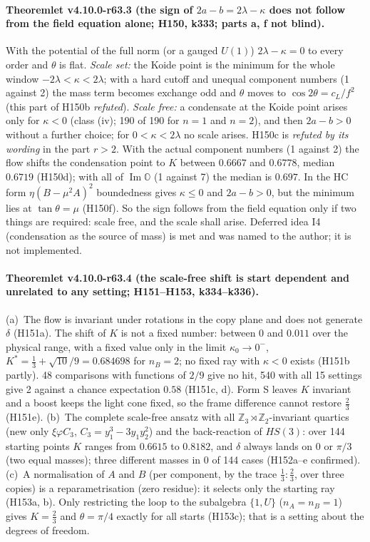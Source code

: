 \paragraph{Theoremlet v4.10.0-r63.3 (the sign of \(2a-b=2\lambda-\kappa\) does not follow from the field equation alone; H150, k333; parts a, f not blind).}
With the potential of the full norm (or a gauged \(U(1)\)) \(2\lambda-\kappa=0\) to every order and \(\theta\) is flat.  \emph{Scale set:} the
Koide point is the minimum for the whole window \(-2\lambda<\kappa<2\lambda\); with a hard cutoff and unequal component numbers (1 against 2) the
mass term becomes exchange odd and \(\theta\) moves to \(\cos2\theta=c_L/f^2\) (this part of H150b \emph{refuted}).  \emph{Scale free:} a
condensate at the Koide point arises only for \(\kappa<0\) (class (iv); 190 of 190 for \(n=1\) and \(n=2\)), and then \(2a-b>0\) without a
further choice; for \(0<\kappa<2\lambda\) no scale arises.  H150c is \emph{refuted by its wording} in the part \(r>2\).  With the actual component
numbers (1 against 2) the flow shifts the condensation point to \(K\) between \(0.6667\) and \(0.6778\), median \(0.6719\) (H150d); with all of
\(\operatorname{Im}\mathbb O\) (1 against 7) the median is \(0.697\).  In the HC form \(\eta(B-\mu^2A)^2\) boundedness gives \(\kappa\le0\) and
\(2a-b>0\), but the minimum lies at \(\tan\theta=\mu\) (H150f).  So the sign follows from the field equation only if two things are required:
scale free, and the scale shall arise.  Deferred idea I4 (condensation as the source of mass) is met and was named to the author; it is not
implemented.

\paragraph{Theoremlet v4.10.0-r63.4 (the scale-free shift is start dependent and unrelated to any setting; H151--H153, k334--k336).}
(a)~The flow is invariant under rotations in the copy plane and does not generate \(\delta\) (H151a).  The shift of \(K\) is not a fixed number:
between \(0\) and \(0.011\) over the physical range, with a fixed value only in the limit \(\kappa_0\to0^-\),
\(K^*=\tfrac13+\sqrt{10}/9=0.684698\) for \(n_B=2\); no fixed ray with \(\kappa<0\) exists (H151b partly).  48 comparisons with functions of
\(2/9\) give no hit, 540 with all 15 settings give 2 against a chance expectation \(0.58\) (H151c, d).  Form S leaves \(K\) invariant and a boost
keeps the light cone fixed, so the frame difference cannot restore \(\tfrac23\) (H151e).
(b)~The complete scale-free ansatz with all \(\mathbb Z_3\rtimes\mathbb Z_2\)-invariant quartics (new only \(\xi\varphi C_3\),
\(C_3=y_1^3-3y_1y_2^2\)) and the back-reaction of \(HS(3)\): over 144 starting points \(K\) ranges from \(0.6615\) to \(0.8182\), and \(\delta\)
always lands on \(0\) or \(\pi/3\) (two equal masses); three different masses in 0 of 144 cases (H152a--e confirmed).
(c)~A normalisation of \(A\) and \(B\) (per component, by the trace \(\tfrac13:\tfrac23\), over three copies) is a reparametrisation (zero
residue): it selects only the starting ray (H153a, b).  Only restricting the loop to the subalgebra \(\{1,U\}\) (\(n_A=n_B=1\)) gives
\(K=\tfrac23\) and \(\theta=\pi/4\) exactly for all starts (H153c); that is a setting about the degrees of freedom.

